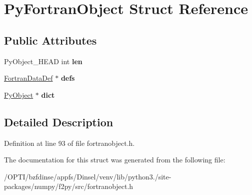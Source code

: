 \hypertarget{structPyFortranObject}{}\section{Py\+Fortran\+Object Struct Reference}
\label{structPyFortranObject}
\subsection*{Public Attributes}
\begin{DoxyCompactItemize}
\item 
Py\+Object\+\_\+\+H\+E\+AD int {\bfseries len}\hypertarget{structPyFortranObject_aa31e81b5bef7f570614b69f5deb05032}{}\label{structPyFortranObject_aa31e81b5bef7f570614b69f5deb05032}

\item 
\hyperlink{structFortranDataDef}{Fortran\+Data\+Def} $\ast$ {\bfseries defs}\hypertarget{structPyFortranObject_a39f1d324e82b052b8d66d9e5e28f97d5}{}\label{structPyFortranObject_a39f1d324e82b052b8d66d9e5e28f97d5}

\item 
\hyperlink{struct__object}{Py\+Object} $\ast$ {\bfseries dict}\hypertarget{structPyFortranObject_a8e589a13bed1070f68f8094e91a54bec}{}\label{structPyFortranObject_a8e589a13bed1070f68f8094e91a54bec}

\end{DoxyCompactItemize}


\subsection{Detailed Description}


Definition at line 93 of file fortranobject.\+h.



The documentation for this struct was generated from the following file\+:\begin{DoxyCompactItemize}
\item 
/\+O\+P\+T\+I/bzfdinse/appfs/\+Dinsel/venv/lib/python3./site-\/packages/numpy/f2py/src/fortranobject.\+h\end{DoxyCompactItemize}
